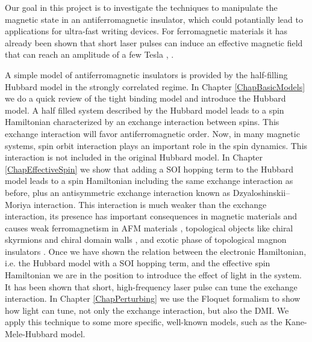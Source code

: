 Our goal in this project is to investigate the techniques to manipulate the magnetic state in an antiferromagnetic insulator, which could potantially lead to applications for ultra-fast writing devices. For ferromagnetic materials it has already been shown that short laser pulses can induce an effective magnetic field that can reach an amplitude of a few Tesla \cite{Qaiumzadeh2016}, \cite{Qaiumzadeh2013}.

A simple model of antiferromagnetic insulators is provided by the half-filling Hubbard model in the strongly correlated regime. In Chapter \ref{ChapBasicModels} we do a quick review of the tight binding model and introduce the Hubbard model. A half filled system described by the Hubbard model leads to a spin Hamiltonian characterized by an exchange interaction between spins. This exchange interaction will favor antiferromagnetic order. Now, in many magnetic systems, spin orbit interaction plays an important role in the spin dynamics. This interaction is not included in the original Hubbard model. In Chapter \ref{ChapEffectiveSpin} we show that adding a SOI hopping term to the Hubbard model leads to a spin Hamiltonian including the same exchange interaction as before, plus an antisymmetric exchange interaction known as Dzyaloshinskii–Moriya interaction. This interaction is much weaker than the exchange interaction, its presence has important consequences in magnetic materials and causes weak ferromagnetism in AFM materials \cite{dzyaloshinsky1958, Moriya1960}, topological objects like chiral skyrmions \cite{muhlbauer2009,Fert2017,Alireza-DMI1,Alireza-DMI2} and chiral domain walls \cite{Thiaville2012,Parkin,AlirezaSW}, and exotic phase of topological magnon insulators \cite{Owerre2016,Elyasi2018,Chen2018,Owerre1,Owerre2}. Once we have shown the relation between the electronic Hamiltonian, i.e. the Hubbard model with a SOI hopping term, and the effective spin Hamiltonian we are in the position to introduce the effect of light in the system. It has been shown that short, high-frequency laser pulse can tune the exchange interaction\cite{Mentink2014,Itin2015,Mentink2015,Meyer2017,Stepanov2017,Kitamura2017,MentinkReview,Barbeau2018}. In Chapter \ref{ChapPerturbing} we use the Floquet formalism to show how light can tune, not only the exchange interaction, but also the DMI. We apply this technique to some more specific, well-known models, such as the Kane-Mele-Hubbard model.





















